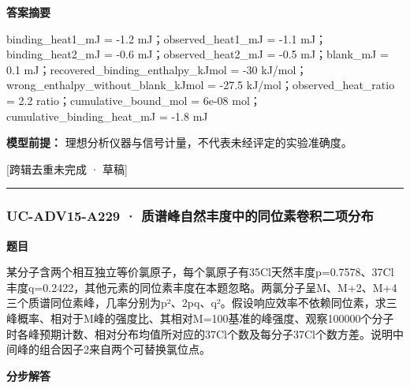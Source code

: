 \documentclass[UTF8,11pt,a4paper]{ctexart}
\begin{document}
\noindent\textbf{答案摘要}\par
binding\_heat1\_mJ = -1.2 mJ；observed\_heat1\_mJ = -1.1 mJ；binding\_heat2\_mJ = -0.6 mJ；observed\_heat2\_mJ = -0.5 mJ；blank\_mJ = 0.1 mJ；recovered\_binding\_enthalpy\_kJmol = -30 kJ/mol；wrong\_enthalpy\_without\_blank\_kJmol = -27.5 kJ/mol；observed\_heat\_ratio = 2.2 ratio；cumulative\_bound\_mol = 6e-08 mol；cumulative\_binding\_heat\_mJ = -1.8 mJ\par
\noindent\textbf{模型前提：}
理想分析仪器与信号计量，不代表未经评定的实验准确度。\par
\noindent\textcolor{red!65!black}{[跨辑去重未完成 · 草稿]} \par
\medskip\hrule\medskip
{}
\subsubsection*{UC-ADV15-A229 · 质谱峰自然丰度中的同位素卷积二项分布}
\noindent\textbf{题目}\par
某分子含两个相互独立等价氯原子，每个氯原子有35Cl天然丰度p=0.7578、37Cl丰度q=0.2422，其他元素的同位素丰度在本题忽略。两氯分子呈M、M+2、M+4三个质谱同位素峰，几率分别为p²、2pq、q²。假设响应效率不依赖同位素，求三峰概率、相对于M峰的强度比、其相对M=100基准的峰强度、观察100000个分子时各峰预期计数、相对分布均值所对应的37Cl个数及每分子37Cl个数方差。说明中间峰的组合因子2来自两个可替换氯位点。\par
\medskip\noindent\textbf{分步解答}
\end{document}
